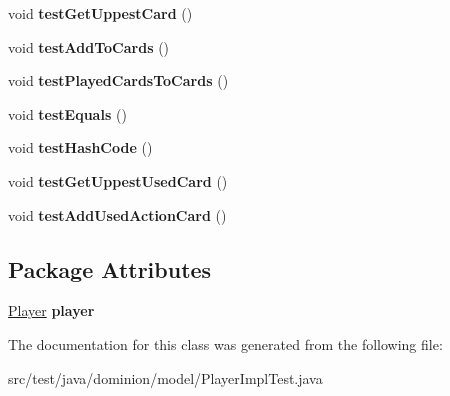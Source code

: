 \begin{DoxyCompactItemize}
\item 
\hypertarget{classdominion_1_1model_1_1PlayerImplTest_a4a79c3341f30a7879a3b35a878260048}{void {\bfseries test\-Get\-Uppest\-Card} ()}\label{classdominion_1_1model_1_1PlayerImplTest_a4a79c3341f30a7879a3b35a878260048}

\item 
\hypertarget{classdominion_1_1model_1_1PlayerImplTest_ad71689128f08c7b5f5fa5105fff7170c}{void {\bfseries test\-Add\-To\-Cards} ()}\label{classdominion_1_1model_1_1PlayerImplTest_ad71689128f08c7b5f5fa5105fff7170c}

\item 
\hypertarget{classdominion_1_1model_1_1PlayerImplTest_a46956df64e4f68be7534b79664341e92}{void {\bfseries test\-Played\-Cards\-To\-Cards} ()}\label{classdominion_1_1model_1_1PlayerImplTest_a46956df64e4f68be7534b79664341e92}

\item 
\hypertarget{classdominion_1_1model_1_1PlayerImplTest_abfcca6882ddf5fa93ebb6ce65b8d713b}{void {\bfseries test\-Equals} ()}\label{classdominion_1_1model_1_1PlayerImplTest_abfcca6882ddf5fa93ebb6ce65b8d713b}

\item 
\hypertarget{classdominion_1_1model_1_1PlayerImplTest_a746436e494fbdbbb19198bc27c8642d4}{void {\bfseries test\-Hash\-Code} ()}\label{classdominion_1_1model_1_1PlayerImplTest_a746436e494fbdbbb19198bc27c8642d4}

\item 
\hypertarget{classdominion_1_1model_1_1PlayerImplTest_a191876cffe910150d9e1b40cfc5df481}{void {\bfseries test\-Get\-Uppest\-Used\-Card} ()}\label{classdominion_1_1model_1_1PlayerImplTest_a191876cffe910150d9e1b40cfc5df481}

\item 
\hypertarget{classdominion_1_1model_1_1PlayerImplTest_a0bf758165333980ef98e77a2c5bc210c}{void {\bfseries test\-Add\-Used\-Action\-Card} ()}\label{classdominion_1_1model_1_1PlayerImplTest_a0bf758165333980ef98e77a2c5bc210c}

\end{DoxyCompactItemize}
\subsection*{\-Package \-Attributes}
\begin{DoxyCompactItemize}
\item 
\hypertarget{classdominion_1_1model_1_1PlayerImplTest_abdad7bcb0d1288e844179245af36c01a}{\hyperlink{interfacedominion_1_1model_1_1Player}{\-Player} {\bfseries player}}\label{classdominion_1_1model_1_1PlayerImplTest_abdad7bcb0d1288e844179245af36c01a}

\end{DoxyCompactItemize}


\-The documentation for this class was generated from the following file\-:\begin{DoxyCompactItemize}
\item 
src/test/java/dominion/model/\-Player\-Impl\-Test.\-java\end{DoxyCompactItemize}
